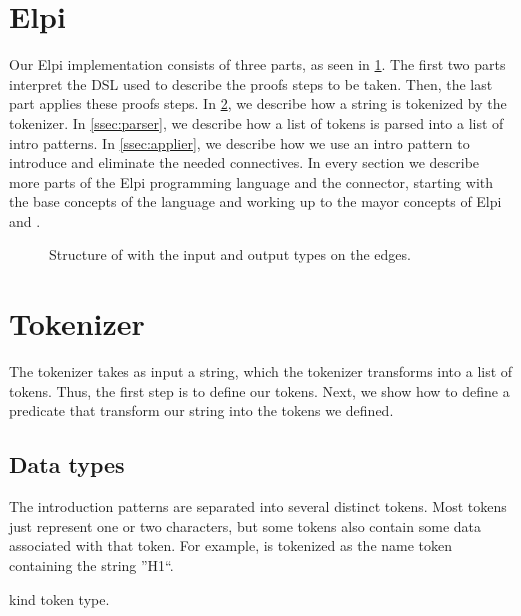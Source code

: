 \documentclass[thesis.tex]{subfiles}
\begin{document}
{\section{Elpi}\label{sec:elpi}
Our Elpi implementation  consists of three parts, as seen in \cref{fig:eiintrosstruct}. The first two parts interpret the DSL used to describe the proofs steps to be taken. Then, the last part applies these proofs steps. In \cref{ssec:tokenizer}, we describe how a string is tokenized by the tokenizer. In \cref{ssec:parser}, we describe how a list of tokens is parsed into a list of intro patterns. In \cref{ssec:applier}, we describe how we use an intro pattern to introduce and eliminate the needed connectives. In every section we describe more parts of the Elpi programming language and the \ce connector, starting with the base concepts of the language and working up to the mayor concepts of Elpi and \ce.
\begin{figure}
  \centering
  \caption{Structure of  with the input and output types on the edges.}
  \label{fig:eiintrosstruct}
\end{figure}

\section{Tokenizer}\label{ssec:tokenizer}
The tokenizer takes as input a string, which the tokenizer transforms into a list of tokens. Thus, the first step is to define our tokens. Next, we show how to define a predicate that transform our string into the tokens we defined.

\subsection{Data types}\label{sssec:datatypes}
The introduction patterns are separated into several distinct tokens. Most tokens just represent one or two characters, but some tokens also contain some data associated with that token. For example,  is tokenized as the name token containing the string ''H1``.
\begin{elpicode}
  kind token type.


\end{elpicode}}
\end{document}
